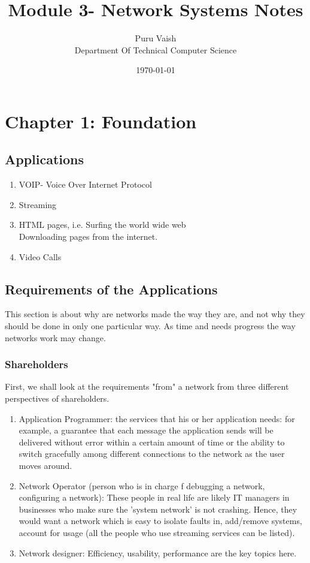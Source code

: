 \documentclass[11pt, a4paper]{article}
\title{\vspace{-1.5cm}Module 3- Network Systems Notes}
\author{Puru Vaish\\Department Of Technical Computer Science}
\date{\today}
\begin{document}
\maketitle
\section{Chapter 1: Foundation}
\subsection{Applications}
\begin{enumerate}
    \item VOIP- Voice Over Internet Protocol
    \item Streaming
    \item HTML pages, i.e. Surfing the world wide web\\
    Downloading pages from the internet.
    \item Video Calls
\end{enumerate}
\subsection{Requirements of the Applications}
This section is about why are networks made the way they are, and not why they should be done in only one particular way. As time and needs progress the way networks work may change. 
\subsubsection{Shareholders}
First, we shall look at the requirements "from" a network from three different perspectives of shareholders.
\begin{enumerate}
    \item Application Programmer:
    the services that his or her application needs: for example, a guarantee that each message the application sends will be delivered without error within a certain amount of time or the ability to switch gracefully among different connections to the network as the user moves around.
    \item Network Operator (person who is in charge f debugging a network, configuring a network): These people in real life are likely IT managers in businesses who make sure the 'system network' is not crashing. Hence, they would want a network which is easy to isolate faults in, add/remove systems, account for usage (all the people who use streaming services can be listed).
    \item Network designer: Efficiency, usability, performance are the key topics here.
\end{enumerate}
\end{document}
